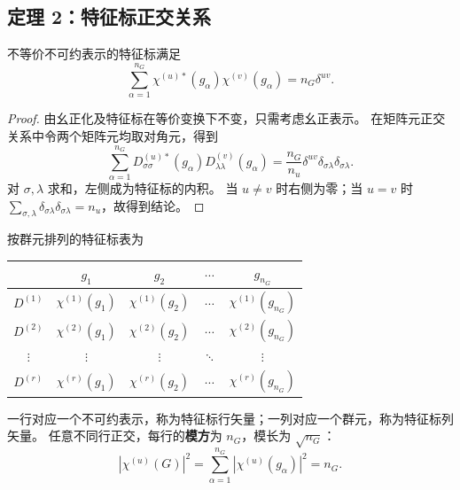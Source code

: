 \subsection{定理 2：特征标正交关系}
\begin{theorem}
不等价不可约表示的特征标满足
\begin{equation}
\sum_{\alpha=1}^{n_G}\chi^{\left(u\right)*}\left(g_\alpha\right)\chi^{\left(v\right)}\left(g_\alpha\right)
=n_G\delta^{uv}.
\end{equation}
\end{theorem}
\begin{proof}
由幺正化及特征标在等价变换下不变，只需考虑幺正表示。
在矩阵元正交关系中令两个矩阵元均取对角元，得到
\begin{equation}
\sum_{\alpha=1}^{n_G}D^{\left(u\right)*}_{\sigma\sigma}\left(g_\alpha\right)
D^{\left(v\right)}_{\lambda\lambda}\left(g_\alpha\right)
=\frac{n_G}{n_u}\delta^{uv}\delta_{\sigma\lambda}\delta_{\sigma\lambda}.
\end{equation}
对 $\sigma,\lambda$ 求和，左侧成为特征标的内积。
当 $u\ne v$ 时右侧为零；当 $u=v$ 时
$\sum_{\sigma,\lambda}\delta_{\sigma\lambda}\delta_{\sigma\lambda}=n_u$，故得到结论。
\end{proof}

按群元排列的特征标表为
\begin{center}
\begin{tabular}{c|cccc}
\toprule
 & $g_1$ & $g_2$ & $\cdots$ & $g_{n_G}$\\\midrule
$D^{\left(1\right)}$ & $\chi^{\left(1\right)}\left(g_1\right)$ & $\chi^{\left(1\right)}\left(g_2\right)$ & $\cdots$ & $\chi^{\left(1\right)}\left(g_{n_G}\right)$\\
$D^{\left(2\right)}$ & $\chi^{\left(2\right)}\left(g_1\right)$ & $\chi^{\left(2\right)}\left(g_2\right)$ & $\cdots$ & $\chi^{\left(2\right)}\left(g_{n_G}\right)$\\
$\vdots$ & $\vdots$ & $\vdots$ & $\ddots$ & $\vdots$\\
$D^{\left(r\right)}$ & $\chi^{\left(r\right)}\left(g_1\right)$ & $\chi^{\left(r\right)}\left(g_2\right)$ & $\cdots$ & $\chi^{\left(r\right)}\left(g_{n_G}\right)$\\\bottomrule
\end{tabular}
\end{center}
一行对应一个不可约表示，称为特征标行矢量；一列对应一个群元，称为特征标列矢量。
任意不同行正交，每行的\textbf{模方}为 $n_G$，模长为 $\sqrt{n_G}$：
\begin{equation}
|\chi^{\left(u\right)}\left(G\right)|^2=\sum_{\alpha=1}^{n_G}|\chi^{\left(u\right)}\left(g_\alpha\right)|^2=n_G.
\end{equation}

